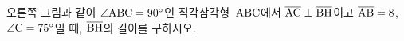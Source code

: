 \noindent\begin{minipage}[t]{0.58\linewidth}\vspace{0pt}\raggedright 오른쪽 그림과 같이 $\angle\mathrm{ABC}=90^\circ$인 직각삼각형~$\mathrm{ABC}$에서 $\overline{\mathrm{AC}}\perp\overline{\mathrm{BH}}$이고 $\overline{\mathrm{AB}}=8$, $\angle\mathrm{C}=75^\circ$일 때, $\overline{\mathrm{BH}}$의 길이를 구하시오. \end{minipage}\hfill\begin{minipage}[t]{0.4\linewidth}\vspace{0pt}\centering \resizebox{\ifdim\width>\linewidth\linewidth\else\width\fi}{!}{}\end{minipage}\par
